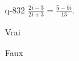 \begin{truefalse}{q-832}
$\frac{2i-3}{2i+3} = \frac{5-6i}{13}$.
\item Vrai
\item* Faux
\end{truefalse}

